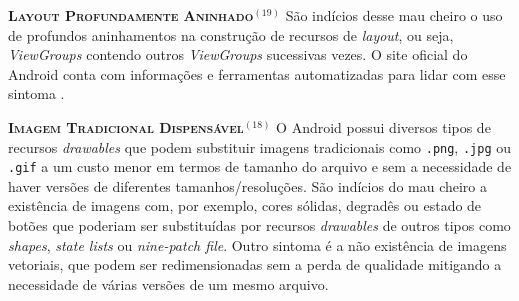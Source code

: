 

  \noindent
  \textbf{\textsc{{\small Layout Profundamente Aninhado}}}$^{(19)}$
      São indícios desse mau cheiro o uso de profundos aninhamentos na construção de recursos de \textit{layout}, ou seja, \textit{ViewGroups} contendo outros \textit{ViewGroups} sucessivas vezes. O site oficial do Android conta com informações e ferramentas automatizadas para lidar com esse sintoma \cite{OptmizingViewHierarchies}. 


  \noindent
  \textbf{\textsc{{\small Imagem Tradicional Dispensável}}}$^{(18)}$
      O Android possui diversos tipos de recursos \textit{drawables} que podem substituir imagens tradicionais como \texttt{.png}, \texttt{.jpg} ou \texttt{.gif} a um custo menor em termos de tamanho do arquivo e sem a necessidade de haver versões de diferentes tamanhos/resoluções. São indícios do mau cheiro a existência de imagens com, por exemplo, cores sólidas, degradês ou estado de botões que poderiam ser substituídas por recursos \textit{drawables} de outros tipos como \textit{shapes}, \textit{state lists} ou \textit{nine-patch file}. Outro sintoma é a não existência de imagens vetoriais, que podem ser redimensionadas sem a perda de qualidade mitigando a necessidade de várias versões de um mesmo arquivo.


